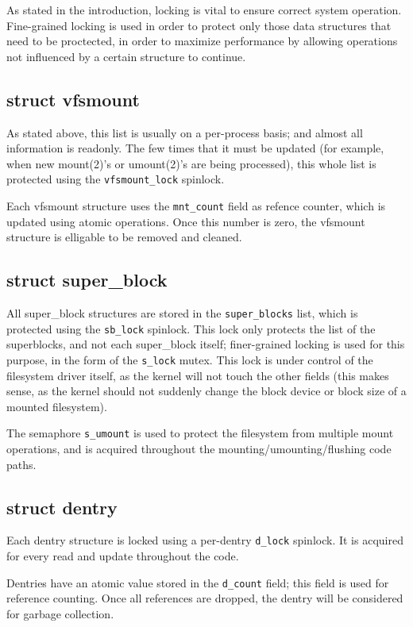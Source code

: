 \documentclass[a4paper,11pt]{article}
\begin{document}
As stated in the introduction, locking is vital to ensure correct system operation.  Fine-grained locking is used in order to protect only those data structures that need to be proctected, in order to maximize performance by allowing operations not influenced by a certain structure to continue.

\subsection{struct vfsmount}

As stated above, this list is usually on a per-process basis; and almost all information is readonly. The few times that it must be updated (for example, when new mount(2)'s or umount(2)'s are being processed), this whole list is protected using the \texttt{vfsmount\_lock} spinlock.

Each vfsmount structure uses the \texttt{mnt\_count} field as refence counter, which is updated using atomic operations. Once this number is zero, the vfsmount structure is elligable to be removed and cleaned.

\subsection{struct super\_block}

All super\_block structures are stored in the \texttt{super\_blocks} list, which is protected using the \texttt{sb\_lock} spinlock. This lock only protects the list of the superblocks, and not each super\_block itself; finer-grained locking is used for this purpose, in the form of the \texttt{s\_lock} mutex. This lock is under control of the filesystem driver itself, as the kernel will not touch the other fields (this makes sense, as the kernel should not suddenly change the block device or block size of a mounted filesystem).

The semaphore \texttt{s\_umount} is used to protect the filesystem from multiple mount operations, and is acquired throughout the mounting/umounting/flushing code paths.

\subsection{struct dentry}

Each dentry structure is locked using a per-dentry \texttt{d\_lock} spinlock. It is acquired for every read and update throughout the code.

Dentries have an atomic value stored in the \texttt{d\_count} field; this field is used for reference counting. Once all references are dropped, the dentry will be considered for garbage collection.
\end{document}
